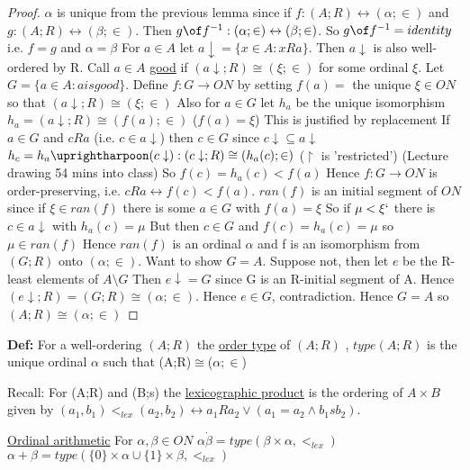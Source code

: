 \documentclass{article}
\begin{document}
    \begin{proof}
        $\alpha$ is unique from the previous lemma since if $f : (A;R) \leftrightarrow (\alpha;\in)$ and $g : (A;R) \leftrightarrow (\beta;\in)$.
        Then $g \of f^{-1} : (\alpha;\in) \leftrightarrow (\beta;\in)$.
        So $g \of f^{-1} = identity$ i.e. $f=g$ and $\alpha = \beta$
        For $a \in A$ let $a \downarrow = \{x\in A : x R a\}$.
        Then $a \downarrow$ is also well-ordered by R.
        Call $a \in A$ \underline{good} if $(a \downarrow;R) \cong (\xi; \in)$ for some ordinal $\xi$.
        Let $G = \{a \in A : a is good\}$.
        Define $f : G \rightarrow ON$ by setting $f(a) = $ the unique $\xi \in ON$ so that $(a\downarrow;R)\cong(\xi;\in)$
        Also for $a \in G$ let $h_a$ be the unique isomorphism $h_a=(a\downarrow;R)\cong(f(a);\in)$ ($f(a)=\xi$)
        This is justified by replacement
        If $a\in G$ and $c R a$ (i.e. $c \in a\downarrow$) then $c \in G$ since $c \downarrow \subseteq a\downarrow$
        $h_c = h_a \uprightharpoon(c\downarrow): (c\downarrow;R)\cong(h_a(c);\in)$
        ($\upharpoonright$ is 'restricted')
        (Lecture drawing 54 mins into class)
        So $f(c) = h_a(c) < f(a)$
        Hence $f : G \rightarrow ON$ is order-preserving, i.e. $cRa \leftrightarrow f(c) < f(a)$.
        $ran(f)$ is an initial segment of $ON$ since if $\xi \in  ran(f)$ there is some $a \in G$ with $f(a) = \xi$
        So if $\mu < \xi`$ there is $c \in a\downarrow$ with $h_a(c) = \mu$
        But then $c \in G$ and $f(c) = h_a(c) = \mu$ so $\mu \in ran(f)$
        Hence $ran(f)$ is an ordinal $\alpha$ and f is an isomorphism from $(G;R)$ onto $(\alpha;\in)$.
        Want to show $G=A$.
        Suppose not, then let $e$ be the R-least elements of $A \setminus G$
        Then $e \downarrow = G$ since G is an R-initial segment of A.
        Hence $(e \downarrow;R) = (G;R) \cong (\alpha;\in)$.
        Hence $e \in G$, contradiction.
        Hence $G=A$ so $(A;R)\cong(\alpha;\in)$
    \end{proof}

    \textbf{Def: } For a well-ordering $(A;R)$ the \underline{order type} of $(A;R)$ , $type(A;R)$ is the unique ordinal $\alpha$ such that (A;R)$\cong$($\alpha;\in$)

    Recall: For (A;R) and (B;s) the \underline{lexicographic product} is the ordering of $A \times B$ given by $(a_1,b_1) <_{lex}(a_2,b_2) \leftrightarrow a_1 R a_2 \vee (a_1 = a_2 \wedge b_1 s b_2)$.

     \underline{Ordinal arithmetic}
    For $\alpha,\beta \in ON$
    $\alpha \dot \beta = type(\beta \times \alpha, <_{lex})$
    $\alpha + \beta = type(\{0\}\times \alpha \cup \{1\} \times \beta, <_{lex})$
\end{document}
